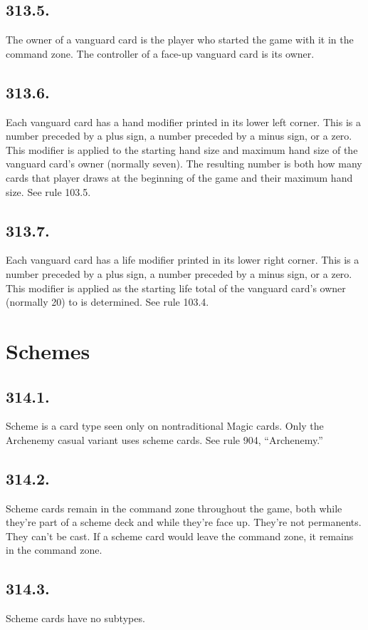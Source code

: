 \subsection*{313.5.}
The owner of a vanguard card is the player who started the game with it in the command zone. The controller of a face-up vanguard card is its owner.

\subsection*{313.6.}
Each vanguard card has a hand modifier printed in its lower left corner. This is a number preceded by a plus sign, a number preceded by a minus sign, or a zero. This modifier is applied to the starting hand size and maximum hand size of the vanguard card’s owner (normally seven). The resulting number is both how many cards that player draws at the beginning of the game and their maximum hand size. See rule 103.5.

\subsection*{313.7.}
Each vanguard card has a life modifier printed in its lower right corner. This is a number preceded by a plus sign, a number preceded by a minus sign, or a zero. This modifier is applied as the starting life total of the vanguard card’s owner (normally 20) to is determined. See rule 103.4.

\section{Schemes}
\subsection*{314.1.}
Scheme is a card type seen only on nontraditional Magic cards. Only the Archenemy casual variant uses scheme cards. See rule 904, “Archenemy.”

\subsection*{314.2.}
Scheme cards remain in the command zone throughout the game, both while they’re part of a scheme deck and while they’re face up. They’re not permanents. They can’t be cast. If a scheme card would leave the command zone, it remains in the command zone.

\subsection*{314.3.}
Scheme cards have no subtypes.

